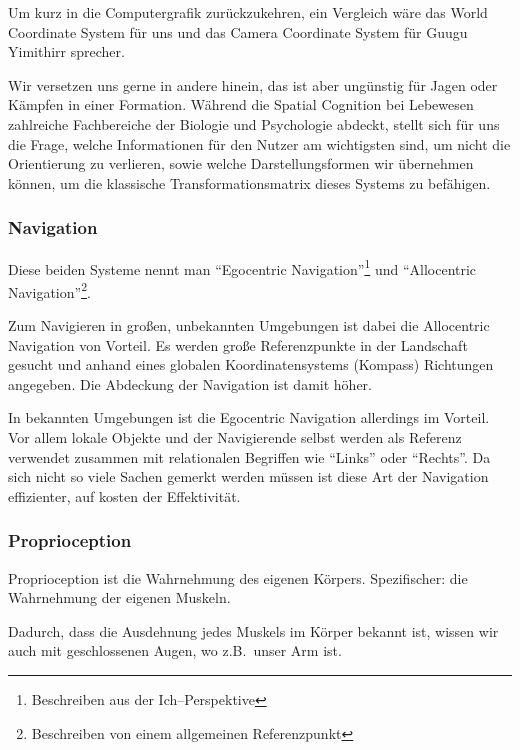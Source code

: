     Um kurz in die Computergrafik zurückzukehren, ein Vergleich wäre das World Coordinate System für uns und das Camera Coordinate System für Guugu Yimithirr sprecher.

    Wir versetzen uns gerne in andere hinein, das ist aber ungünstig für Jagen oder Kämpfen in einer Formation.
    Während die Spatial Cognition bei Lebewesen zahlreiche Fachbereiche der Biologie und Psychologie abdeckt, stellt sich für uns die Frage, welche Informationen für den Nutzer am wichtigsten sind, um nicht die Orientierung zu verlieren, sowie welche Darstellungsformen wir übernehmen können, um die klassische Transformationsmatrix dieses Systems zu befähigen.

    \subsubsection{Navigation}\label{subsubsec:navigation}
        Diese beiden Systeme nennt man \enquote{Egocentric Navigation}\footnote{Beschreiben aus der Ich--Perspektive} und \enquote{Allocentric Navigation}\footnote{Beschreiben von einem allgemeinen Referenzpunkt}.~\autocite{wikipedia-contributors-2023F}

        Zum Navigieren in großen, unbekannten Umgebungen ist dabei die Allocentric Navigation von Vorteil.
        Es werden große Referenzpunkte in der Landschaft gesucht und anhand eines globalen Koordinatensystems (Kompass) Richtungen angegeben.
        Die Abdeckung der Navigation ist damit höher.

        In bekannten Umgebungen ist die Egocentric Navigation allerdings im Vorteil.
        Vor allem lokale Objekte und der Navigierende selbst werden als Referenz verwendet zusammen mit relationalen Begriffen wie \enquote{Links} oder \enquote{Rechts}.
        Da sich nicht so viele Sachen gemerkt werden müssen ist diese Art der Navigation effizienter, auf kosten der Effektivität.

    \subsubsection{Proprioception}\label{subsubsec:proprioception}
        Proprioception ist die Wahrnehmung des eigenen Körpers. \autocite{wikipedia-contributors-2023H}
        Spezifischer: die Wahrnehmung der eigenen Muskeln.

        Dadurch, dass die Ausdehnung jedes Muskels im Körper bekannt ist, wissen wir auch mit geschlossenen Augen, wo z.B.\ unser Arm ist.

